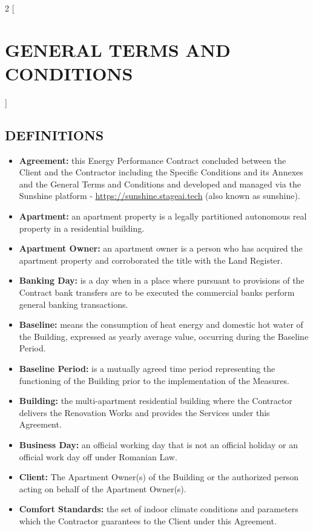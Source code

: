 \begin{multicols}{2}
[\section{GENERAL TERMS AND CONDITIONS}]

\subsection{DEFINITIONS}
\begin{itemize}[label={}]
  	\item\textbf{Agreement:} this Energy Performance Contract concluded between the Client and the Contractor including the Specific Conditions and its Annexes and the General Terms and Conditions and developed and managed via the Sunshine platform - \url{https://sunshine.stageai.tech} (also known as sunshine).
	\item\textbf{Apartment:} an apartment property is a legally partitioned autonomous real property in a residential building.
	\item\textbf{Apartment Owner:} an apartment owner is a person who has acquired the apartment property and corroborated the title with the Land Register.
	\item\textbf{Banking Day:} is a day when in a place where pursuant to provisions of the Contract bank transfers are to be executed the commercial banks perform general banking transactions.
	\item\textbf{Baseline:} means the consumption of heat energy and domestic hot water of the Building, expressed as yearly average value, occurring during the Baseline Period.
	\item\textbf{Baseline Period:} is a mutually agreed time period representing the functioning of the Building prior to the implementation of the Measures.
	\item\textbf{Building:} the multi-apartment residential building where the Contractor delivers the Renovation Works and provides the Services under this Agreement.
	\item\textbf{Business Day:} an official working day that is not an official holiday or an official work day off under Romanian Law.
	\item\textbf{Client:} The Apartment Owner(s) of the Building or the authorized person acting on behalf of the Apartment Owner(s).
	\item\textbf{Comfort Standards:} the set of indoor climate conditions and parameters which the Contractor guarantees to the Client under this Agreement.

\end{itemize}
\end{multicols}
